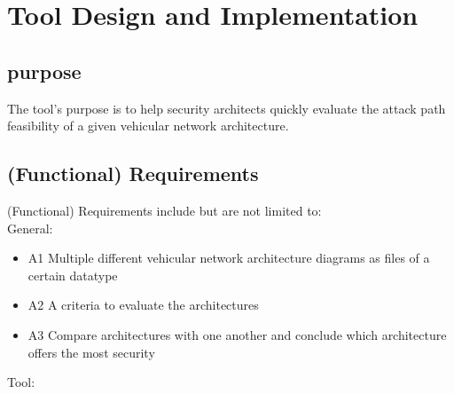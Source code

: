 \chapter{Tool Design and Implementation}
\label{chp:tool}

\section{purpose}\label{sec:purpose}

The tool's purpose is to help security architects quickly evaluate the \gls{attack path} feasibility of a given vehicular network architecture. 

\section{(Functional) Requirements}\label{sec:funct-req}

(Functional) Requirements include but are not limited to:\\

General:

\begin{itemize}
	\item A1\label{sec:a1} Multiple different vehicular network architecture diagrams as files of a certain datatype 
	\item A2\label{sec:a2} A criteria to evaluate the architectures
	\item A3\label{sec:a3} Compare architectures with one another and conclude which architecture offers the most security
\end{itemize}

Tool:

